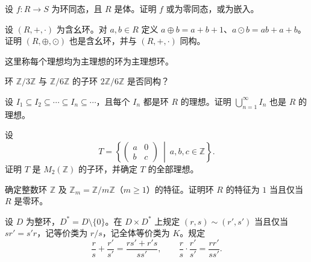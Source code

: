 \newpage
\noindent\begin{minipage}{\textwidth}
设 $f\colon R\to S$ 为环同态，且 $R$ 是体。证明 $f$ 或为零同态，或为嵌入。
\end{minipage}\par\vfill
\noindent\begin{minipage}{\textwidth}
设 $(R,+,\cdot)$ 为含幺环。对 $a,b\in R$ 定义 $a\oplus b=a+b+1$、$a\odot b=ab+a+b$。证明 $(R,\oplus,\odot)$ 也是含幺环，并与 $(R,+,\cdot)$ 同构。
\end{minipage}\par\vfill
\noindent\begin{minipage}{\textwidth}
这里称每个理想均为主理想的环为主理想环。
\end{minipage}\par\vfill
\newpage
\noindent\begin{minipage}{\textwidth}
环 $\mathbb{Z}/3\mathbb{Z}$ 与 $\mathbb{Z}/6\mathbb{Z}$ 的子环 $2\mathbb{Z}/6\mathbb{Z}$ 是否同构？
\end{minipage}\par\vfill
\noindent\begin{minipage}{\textwidth}
设 $I_1\subseteq I_2\subseteq\cdots\subseteq I_n\subseteq\cdots$，且每个 $I_n$ 都是环 $R$ 的理想。证明 $\bigcup_{n=1}^{\infty} I_n$ 也是 $R$ 的理想。
\end{minipage}\par\vfill
\noindent\begin{minipage}{\textwidth}
设
\[
T=\left\{\begin{pmatrix}a&0\\b&c\end{pmatrix}\ \middle|\ a,b,c\in\mathbb{Z}\right\}.
\]
证明 $T$ 是 $M_2(\mathbb{Z})$ 的子环，并确定 $T$ 的全部理想。
\end{minipage}\par\vfill
\newpage
\noindent\begin{minipage}{\textwidth}
确定整数环 $\mathbb{Z}$ 及 $\mathbb{Z}_m=\mathbb{Z}/m\mathbb{Z}$（$m\ge 1$）的特征。证明环 $R$ 的特征为 $1$ 当且仅当 $R$ 是零环。
\end{minipage}\par\vfill
\noindent\begin{minipage}{\textwidth}
设 $D$ 为整环，$D^*=D\setminus\{0\}$。在 $D\times D^*$ 上规定 $(r,s)\sim(r',s')$ 当且仅当 $sr'=s'r$，记等价类为 $r/s$，记全体等价类为 $K$。规定
\[
\frac{r}{s}+\frac{r'}{s'}=\frac{rs'+r's}{ss'},\qquad
\frac{r}{s}\cdot\frac{r'}{s'}=\frac{rr'}{ss'}.
\]
\end{minipage}\par\vfill
